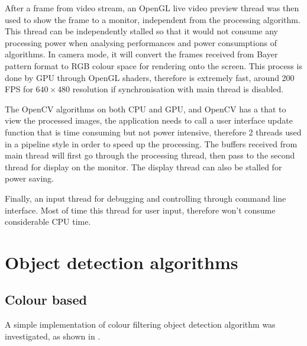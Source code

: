 After  a frame from video stream, an OpenGL live video preview thread was then used to show the frame to a monitor, independent from the processing algorithm. This thread can be independently stalled so that it would not consume any processing power when analysing performances and power consumptions of algorithms. In camera mode, it will convert the frames received from Bayer pattern format to RGB colour space for rendering onto the screen. This process is done by GPU through OpenGL shaders, therefore is extremely fast, around 200 FPS for $640 \times 480$ resolution if synchronisation with main thread is disabled.

The OpenCV algorithms  on both CPU and GPU, and OpenCV has a  that  to view the processed images, the application needs to call a user interface update function that is time consuming but not power intensive, therefore 2 threads  used in a pipeline style in order to speed up the processing. The buffers received from main thread will first go through the processing thread, then pass to the second thread for display on the monitor. The display thread can also be stalled for power saving.


Finally,  an input  thread for debugging and controlling through command line interface. Most of  time this thread  for user input, therefore won't consume considerable CPU time.

\section{Object detection algorithms}

\subsection{Colour based}

A simple implementation of colour filtering object detection algorithm \cite{MOTBOC.git} was investigated, as shown in .

